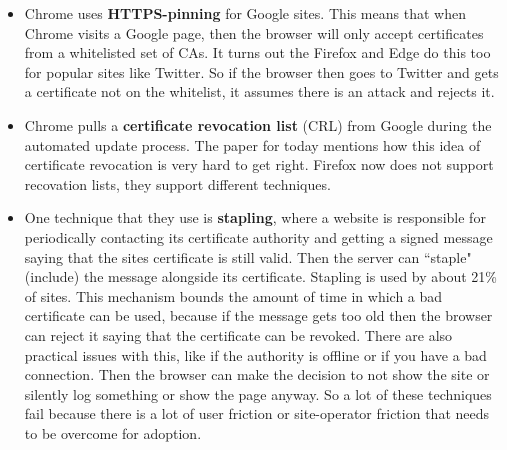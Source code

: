 \documentclass[12pt]{article}
\theoremstyle{definition}
\begin{document}
\begin{itemize}
    \item Chrome uses \textbf{HTTPS-pinning} for Google sites. This means that when Chrome visits a Google page, then the browser will only accept certificates from a whitelisted set of CAs. It turns out the Firefox and Edge do this too for popular sites like Twitter. So if the browser then goes to Twitter and gets a certificate not on the whitelist, it assumes there is an attack and rejects it.
    \item Chrome pulls a \textbf{certificate revocation list} (CRL) from Google during the automated update process. The paper for today mentions how this idea of certificate revocation is very hard to get right. Firefox now does not support recovation lists, they support different techniques. \item One technique that they use is \textbf{stapling}, where a website is responsible for periodically contacting its certificate authority and getting a signed message saying that the sites certificate is still valid. Then the server can ``staple" (include) the message alongside its certificate. Stapling is used by about 21\% of sites. This mechanism bounds the amount of time in which a bad certificate can be used, because if the message gets too old then the browser can reject it saying that the certificate can be revoked. There are also practical issues with this, like if the authority is offline or if you have a bad connection. Then the browser can make the decision to not show the site or silently log something or show the page anyway. So a lot of these techniques fail because there is a lot of user friction or site-operator friction that needs to be overcome for adoption.
\end{itemize}
\end{document}
